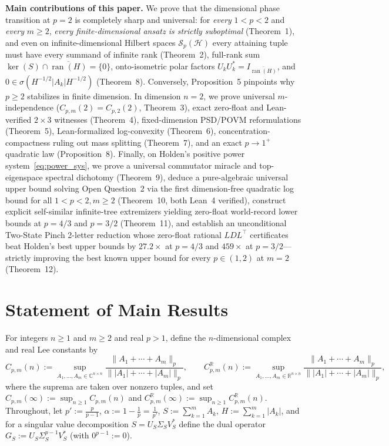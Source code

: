\documentclass[10pt,letterpaper]{article}
\newcommand{\C}{\mathbb{C}}
\newcommand{\R}{\mathbb{R}}
\newcommand{\Hilb}{\mathcal{H}}
\newcommand{\Sp}{\mathcal{S}_p}
\newcommand{\ran}{\operatorname{ran}}
\begin{document}
\medskip
\textbf{Main contributions of this paper.}
We prove that the dimensional phase transition at $p = 2$ is completely sharp and universal: for \emph{every} $1 < p < 2$ and \emph{every} $m \ge 2$, \emph{every finite-dimensional ansatz is strictly suboptimal} (Theorem~1), and even on infinite-dimensional Hilbert spaces $\Sp(\Hilb)$ every attaining tuple must have every summand of infinite rank (Theorem~2), full-rank sum $\ker(S) \cap \overline{\ran(H)} = \{0\}$, onto-isometric polar factors $U_k U_k^* = I_{\overline{\ran(H)}}$, and $0 \in \sigma(H^{-1/2}|A_k|H^{-1/2})$ (Theorem~8). Conversely, Proposition~5 pinpoints why $p \ge 2$ stabilizes in finite dimension. In dimension $n = 2$, we prove universal $m$-independence ($C_{p,m}(2) = C_{p,2}(2)$, Theorem~3), exact zero-float and Lean-verified $2\times 3$ witnesses (Theorem~4), fixed-dimension PSD/POVM reformulations (Theorem~5), Lean-formalized log-convexity (Theorem~6), concentration-compactness ruling out mass splitting (Theorem~7), and an exact $p \to 1^+$ quadratic law (Proposition~8). Finally, on Holden's positive power system~\eqref{eq:power_sys}, we prove a universal commutator miracle and top-eigenspace spectral dichotomy (Theorem~9), deduce a pure-algebraic universal upper bound solving Open Question~2 via the first dimension-free quadratic log bound for all $1<p<2, m\ge 2$ (Theorem~10, both Lean~4 verified), construct explicit self-similar infinite-tree extremizers yielding zero-float world-record lower bounds at $p = 4/3$ and $p = 3/2$ (Theorem~11), and establish an unconditional Two-State Pinch 2-letter reduction whose zero-float rational $LDL^\top$ certificates beat Holden's best upper bounds by $27.2\times$ at $p = 4/3$ and $459\times$ at $p = 3/2$—strictly improving the best known upper bound for every $p \in (1, 2)$ at $m = 2$ (Theorem~12).

\section{Statement of Main Results}

For integers $n \ge 1$ and $m \ge 2$ and real $p > 1$, define the $n$-dimensional complex and real Lee constants by
\begin{equation}\label{eq:defC}
  C_{p,m}(n) := \sup_{A_1,\dots,A_m \in \C^{n\times n}} \frac{\|A_1 + \cdots + A_m\|_p}{\||A_1| + \cdots + |A_m|\|_p},
  \qquad
  C_{p,m}^{\R}(n) := \sup_{A_1,\dots,A_m \in \R^{n\times n}} \frac{\|A_1 + \cdots + A_m\|_p}{\||A_1| + \cdots + |A_m|\|_p},
\end{equation}
where the suprema are taken over nonzero tuples, and set $C_{p,m}(\infty) := \sup_{n \ge 1} C_{p,m}(n)$ and $C_{p,m}^{\R}(\infty) := \sup_{n \ge 1} C_{p,m}^{\R}(n)$. Throughout, let $p' := \frac{p}{p-1}$, $\alpha := 1 - \frac{1}{p} = \frac{1}{p'}$, $S := \sum_{k=1}^m A_k$, $H := \sum_{k=1}^m |A_k|$, and for a singular value decomposition $S = U_S \Sigma_S V_S^*$ define the dual operator $G_S := U_S \Sigma_S^{p-1} V_S^*$ (with $0^{p-1} := 0$).
\end{document}
